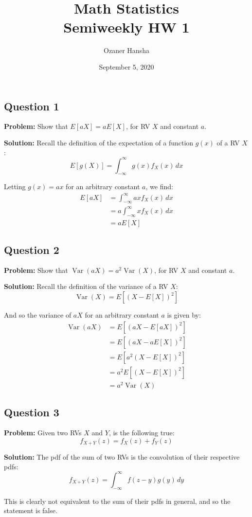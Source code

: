 \documentclass{article}
\DeclareMathOperator{\Var}{Var}
\begin{document}
\title{Math Statistics\\ Semiweekly HW 1}
\author{Ozaner Hansha}
\date{September 5, 2020}
\maketitle

\subsection*{Question 1}
\noindent\textbf{Problem:} Show that $E[aX]=aE[X]$, for RV $X$ and constant $a$.
\bigskip

\noindent\textbf{Solution:} Recall the definition of the expectation of a function $g(x)$ of a RV $X$:
$$E[g(X)]=\int^\infty_{-\infty}g(x)f_X(x)\,dx$$

Letting $g(x)=ax$ for an arbitrary constant $a$, we find:
\begin{align*}
  E[aX]&=\int^\infty_{-\infty}axf_X(x)\,dx\tag{def. of expectation}\\
  &=a\int^\infty_{-\infty}xf_X(x)\,dx\tag{linearity of integration}\\
  &=aE[X]\tag{def. of Expectation}
\end{align*}
\smallskip

\subsection*{Question 2}
\noindent\textbf{Problem:} Show that $\Var(aX)=a^2\Var(X)$, for RV $X$ and constant $a$.
\bigskip

\noindent\textbf{Solution:}  Recall the definition of the variance of a RV $X$:
$$\Var(X)=E[(X-E[X])^2]$$

And so the variance of $aX$ for an arbitrary constant $a$ is given by:
\begin{align*}
  \Var(aX)&=E[(aX-E[aX])^2]\tag{def. of variance}\\
  &=E[(aX-aE[X])^2]\tag{linearity of expectation}\\
  &=E[a^2(X-E[X])^2]\tag{algebra}\\
  &=a^2E[(X-E[X])^2]\tag{linearity of expectation}\\
  &=a^2\Var(X)\tag{def. of variance}
\end{align*}
\smallskip

\subsection*{Question 3}
\noindent\textbf{Problem:} Given two RVs $X$ and $Y$, is the following true:
$$f_{X+Y}(z)=f_X(z)+f_Y(z)$$
\smallskip

\noindent\textbf{Solution:} The pdf of the sum of two RVs is the convolution of their respective pdfs:
$$f_{X+Y}(z)=\int^{\infty}_{-\infty}f(z-y)g(y)\,dy$$

This is clearly not equivalent to the sum of their pdfs in general, and so the statement is false.
\bigskip
\end{document}
